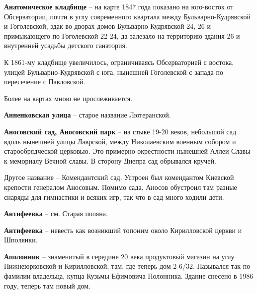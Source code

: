 \medskip


\textbf{Анатомическое кладбище} – на карте 
1847 года показано на юго-восток от Обсерватории, почти в углу современного квартала между Бульварно-Кудрявской и Гоголевской, эдак во дворах домов Бульварно-Кудрявской 24, 26 и примыкающего по Гоголевской 22-24, да залезало на территорию здания 26 и внутренней усадьбы детского санатория.

К 1861-му кладбище увеличилось, ограничиваясь Обсерваторией с востока, улицей Бульварно-Кудрявской с юга, нынешней Гоголевской с запада по пересечение с Павловской.

Более на картах мною не прослеживается.\\
\medskip


\textbf{Анненковская улица} – старое название Лютеранской.\\

\medskip


\textbf{Аносовский сад, Аносовский парк} – на стыке 19-20 веков, небольшой сад вдоль нынешней улицы Лаврской, между Николаевским военным собором и старообрядческой церковью. Это примерно окрестности нынешней Аллеи Славы к мемориалу Вечной славы. В сторону Днепра сад обрывался кручей.

Другое название – Комендантский сад. Устроен был комендантом Киевской крепости генералом Аносовым. Помимо сада, Аносов обустроил там разные снаряды для гимнастики и всяких игр, так что в сад много ходили дети.\\ 

\medskip


\textbf{Антифеевка} – см. Старая поляна.\\

\medskip


\textbf{Антифеевка} – невесть как возникший топоним около Кирилловской церкви и Шполянки.\\

\medskip



\textbf{Аполонник} – знаменитый в середине 20 века продуктовый магазин на углу Нижнеюрковской и Кирилловской, там, где теперь дом 2-6/32. Назывался так по фамилии владельца, купца Кузьмы Ефимовича Полонника. Здание снесено в 1986 году, теперь там новый дом.\\

